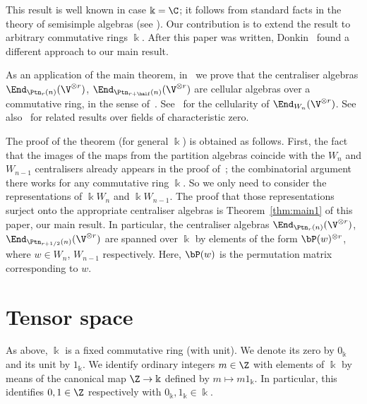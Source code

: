 This result is well known in case $\Bbbk=\C$; it follows from standard
facts in the theory of semisimple algebras (see \eg \cite[Thms~5.4,
 3.6]{HR-2005}). Our contribution is to extend the result to
arbitrary commutative rings $\Bbbk$. After this paper was written,
Donkin~\cite{Donkin:Double} found a different approach to our main
result.

As an application of the main theorem, in~\cite[Cor.~7.6]{BDM:second}
we prove that the centraliser algebras $\End_{\Ptn_r(n)}(\V^{\otimes
 r})$, $\End_{\Ptn_{r+\half}(n)}(\V^{\otimes r})$ are cellular
algebras over a commutative ring, in the sense of~\cite{Graham-Lehrer}. See~\cite{Donkin:Cellularity} for the
cellularity of $\End_{W_n}(\V^{\otimes r})$. See also~\cite{BH:2,
 BH:1} for related results over fields of characteristic zero.

The proof of the theorem (for general $\Bbbk$) is obtained as
follows. First, the fact that the images of the maps from the
partition algebras coincide with the $W_n$ and $W_{n-1}$ centralisers
already appears in the proof of~\cite[Thm.~3.6]{HR-2005}; the
combinatorial argument there works for any commutative ring
$\Bbbk$. So we only need to consider the representations of $\Bbbk
W_n$ and $\Bbbk W_{n-1}$. The proof that those representations surject
onto the appropriate centraliser algebras is Theorem~\ref{thm:main1}
of this paper, our main result. In particular, the centraliser
algebras $\End_{\Ptn_r(n)}(\V^{\otimes r})$,
$\End_{\Ptn_{r+1/2}(n)}(\V^{\otimes r})$ are spanned over $\Bbbk$ by
elements of the form $\bP(w)^{\otimes r}$, where $w \in W_n$,
$W_{n-1}$ respectively. Here, $\bP(w)$ is the permutation matrix
corresponding to $w$.

\section{Tensor space}\label{sec:bimodules}%
As above, $\Bbbk$ is a fixed commutative ring (with unit). We denote
its zero by $0_\Bbbk$ and its unit by $1_\Bbbk$. We identify ordinary
integers $m \in \Z$ with elements of $\Bbbk$ by means of the canonical
map $\Z \to \Bbbk$ defined by $m \mapsto m 1_\Bbbk$. In particular,
this identifies $0,1 \in \Z$ respectively with $0_\Bbbk, 1_\Bbbk \in
\Bbbk$.

